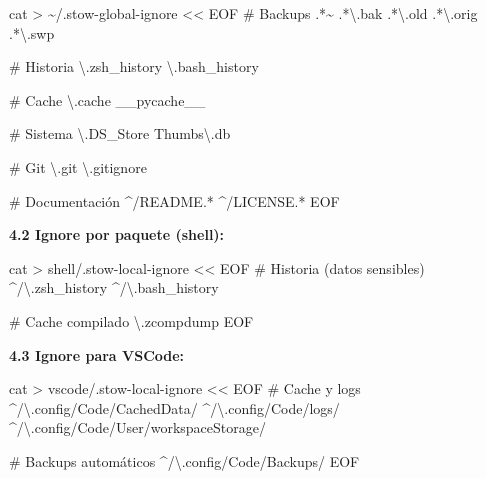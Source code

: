 \documentclass[
  doc,
  floatsintext,
  longtable,
  a4paper,
  nolmodern,
  notxfonts,
  notimes,
  12pt,
  colorlinks=true,linkcolor=blue,citecolor=blue,urlcolor=blue]{apa7}
\newenvironment{Shaded}{\begin{snugshade}}{\end{snugshade}}
\newcommand{\FunctionTok}[1]{\textcolor[rgb]{0.28,0.35,0.67}{#1}}
\newcommand{\NormalTok}[1]{\textcolor[rgb]{0.00,0.23,0.31}{#1}}
\newcommand{\OperatorTok}[1]{\textcolor[rgb]{0.37,0.37,0.37}{#1}}
\newcommand{\StringTok}[1]{\textcolor[rgb]{0.13,0.47,0.30}{#1}}
\begin{document}
\begin{Shaded}
\begin{Highlighting}[]
\FunctionTok{cat} \OperatorTok{\textgreater{}}\NormalTok{ \textasciitilde{}/.stow{-}global{-}ignore }\OperatorTok{\textless{}\textless{} \textquotesingle{}EOF\textquotesingle{}}
\StringTok{\# Backups}
\StringTok{.*\textasciitilde{}}
\StringTok{.*\textbackslash{}.bak}
\StringTok{.*\textbackslash{}.old}
\StringTok{.*\textbackslash{}.orig}
\StringTok{.*\textbackslash{}.swp}

\StringTok{\# Historia}
\StringTok{\textbackslash{}.zsh\_history}
\StringTok{\textbackslash{}.bash\_history}

\StringTok{\# Cache}
\StringTok{\textbackslash{}.cache}
\StringTok{\_\_pycache\_\_}

\StringTok{\# Sistema}
\StringTok{\textbackslash{}.DS\_Store}
\StringTok{Thumbs\textbackslash{}.db}

\StringTok{\# Git}
\StringTok{\textbackslash{}.git}
\StringTok{\textbackslash{}.gitignore}

\StringTok{\# Documentación}
\StringTok{\^{}/README.*}
\StringTok{\^{}/LICENSE.*}
\OperatorTok{EOF}
\end{Highlighting}
\end{Shaded}

\textbf{4.2 Ignore por paquete (shell):}

\begin{Shaded}
\begin{Highlighting}[]
\FunctionTok{cat} \OperatorTok{\textgreater{}}\NormalTok{ shell/.stow{-}local{-}ignore }\OperatorTok{\textless{}\textless{} \textquotesingle{}EOF\textquotesingle{}}
\StringTok{\# Historia (datos sensibles)}
\StringTok{\^{}/\textbackslash{}.zsh\_history}
\StringTok{\^{}/\textbackslash{}.bash\_history}

\StringTok{\# Cache compilado}
\StringTok{\textbackslash{}.zcompdump}
\OperatorTok{EOF}
\end{Highlighting}
\end{Shaded}

\textbf{4.3 Ignore para VSCode:}

\begin{Shaded}
\begin{Highlighting}[]
\FunctionTok{cat} \OperatorTok{\textgreater{}}\NormalTok{ vscode/.stow{-}local{-}ignore }\OperatorTok{\textless{}\textless{} \textquotesingle{}EOF\textquotesingle{}}
\StringTok{\# Cache y logs}
\StringTok{\^{}/\textbackslash{}.config/Code/CachedData/}
\StringTok{\^{}/\textbackslash{}.config/Code/logs/}
\StringTok{\^{}/\textbackslash{}.config/Code/User/workspaceStorage/}

\StringTok{\# Backups automáticos}
\StringTok{\^{}/\textbackslash{}.config/Code/Backups/}
\OperatorTok{EOF}
\end{Highlighting}
\end{Shaded}
\end{document}
